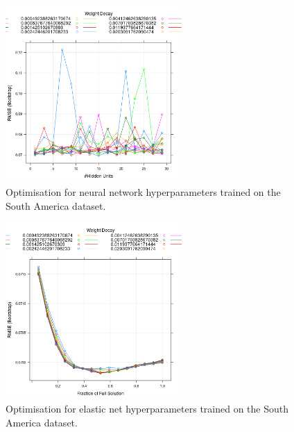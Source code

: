 \documentclass[review]{elsarticle}
\begin{document}
\begin{figure}[h!]
  \centering
  \includegraphics[width=0.6\textwidth]{figs/SI/nnetopt_sa.png}
\caption{
  Optimisation for neural network hyperparameters trained on the South America dataset.
}

\end{figure}


\begin{figure}[h!]
  \centering
  \includegraphics[width=0.6\textwidth]{figs/SI/enetopt_sa.png}
\caption{
  Optimisation for elastic net hyperparameters trained on the South America dataset.
}
\end{figure}
\end{document}
